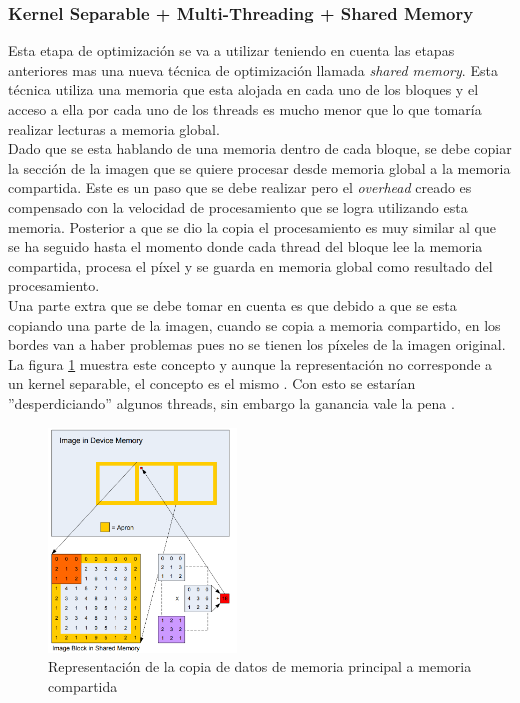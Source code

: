 \documentclass[conference]{IEEEtran}
\begin{document}
\subsubsection{\textbf{Kernel Separable + Multi-Threading + Shared Memory}}
Esta etapa de optimización se va a utilizar teniendo en cuenta las etapas anteriores mas una nueva técnica de optimización llamada \textit{shared memory}. Esta técnica utiliza una memoria que esta alojada en cada uno de los bloques y el acceso a ella por cada uno de los threads es mucho menor que lo que tomaría realizar lecturas a memoria global.\\
Dado que se esta hablando de una memoria dentro de cada bloque, se debe copiar la sección de la imagen que se quiere procesar desde memoria global a la memoria compartida. Este es un paso que se debe realizar pero el \textit{overhead }creado es compensado con la velocidad de procesamiento que se logra utilizando esta memoria. Posterior a que se dio la copia el procesamiento es muy similar al que se ha seguido hasta el momento donde cada thread del bloque lee la memoria compartida, procesa el píxel y se guarda en memoria global como resultado del procesamiento.\\
Una parte extra que se debe tomar en cuenta es que debido a que se esta copiando una parte de la imagen, cuando se copia a memoria compartido, en los bordes van a haber problemas pues no se tienen los píxeles de la imagen original. La figura \ref{shared_mem} muestra este concepto y aunque la representación no corresponde a un kernel separable, el concepto es el mismo . Con esto se estarían ''desperdiciando'' algunos threads, sin embargo la ganancia vale la pena \cite{cuda_by_example}\cite{victor_cuda}\cite{nvidia_separable}.
\begin{figure}[H]
\centering
\includegraphics[width=5cm]{shared_mem}
\caption{Representación de la copia de datos de memoria principal a memoria compartida \cite{victor_cuda}}
\label{shared_mem}
\end{figure}
\end{document}
